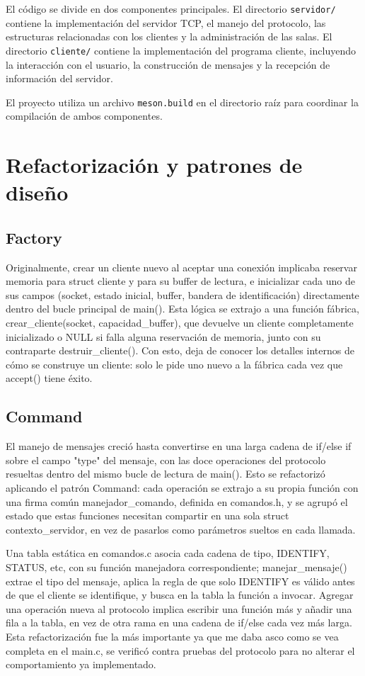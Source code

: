 \documentclass[12pt,a4paper]{article}
\begin{document}
El código se divide en dos componentes principales. El directorio
\texttt{servidor/} contiene la implementación del servidor TCP, el manejo
del protocolo, las estructuras relacionadas con los clientes y la
administración de las salas. El directorio \texttt{cliente/} contiene la
implementación del programa cliente, incluyendo la interacción con el
usuario, la construcción de mensajes y la recepción de información del
servidor.

El proyecto utiliza un archivo \texttt{meson.build} en el directorio raíz
para coordinar la compilación de ambos componentes.

\section{Refactorización y patrones de diseño}
\subsection{Factory}
Originalmente, crear un cliente nuevo al aceptar una conexión implicaba
reservar memoria para struct cliente y para su buffer de lectura,
e inicializar cada uno de sus campos (socket, estado inicial, buffer,
bandera de identificación) directamente dentro del bucle principal de
main(). Esta lógica se extrajo a una función fábrica,
crear\_cliente(socket, capacidad\_buffer), que
devuelve un cliente completamente inicializado o NULL si falla
alguna reservación de memoria, junto con su contraparte
destruir\_cliente(). Con esto, deja de conocer los
detalles internos de cómo se construye un cliente: solo le pide uno nuevo a
la fábrica cada vez que accept() tiene éxito.

\subsection{Command}
El manejo de mensajes creció hasta convertirse en una larga cadena de
if/else if sobre el campo "type" del mensaje, con las doce
operaciones del protocolo resueltas dentro del mismo bucle de lectura de
main(). Esto se refactorizó aplicando el patrón Command: cada
operación se extrajo a su propia función con una firma común
manejador\_comando, definida en comandos.h, y se agrupó el
estado que estas funciones necesitan compartir en una sola
struct contexto\_servidor, en vez de pasarlos como parámetros sueltos
en cada llamada.

Una tabla estática en comandos.c asocia cada cadena de tipo, 
IDENTIFY, STATUS, etc, con su función manejadora
correspondiente; manejar\_mensaje() extrae el tipo del mensaje,
aplica la regla de que solo IDENTIFY es válido antes de que el
cliente se identifique, y busca en la tabla la función a invocar. 
Agregar una operación nueva al protocolo implica escribir una función más y 
añadir una fila a la tabla, en vez de otra rama en una cadena de 
if/else cada vez más larga. Esta refactorización fue la más importante 
ya que me daba asco como se vea completa en el main.c, se verificó contra 
pruebas del protocolo para no alterar el comportamiento ya
implementado.
\end{document}

